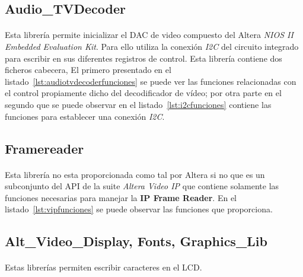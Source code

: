 \documentclass[a4paper,12pt,titlepage,final]{book}
\begin{document}
\subsection{Audio\_TVDecoder}
\paragraph{}
Esta librería permite inicializar el DAC de video compuesto del Altera \textit{NIOS II Embedded Evaluation Kit}. Para ello utiliza la conexión \textit{I2C} del circuito integrado para escribir en sus diferentes registros de control. Esta librería contiene dos ficheros cabecera, El primero presentado en el listado~\ref{lst:audiotvdecoderfunciones} se puede ver las funciones relacionadas con el control propiamente dicho del decodificador de vídeo; por otra parte en el segundo que se puede observar en el listado~\ref{lst:i2cfunciones} contiene las funciones para establecer una conexión \textit{I2C}.







\subsection{Framereader}
\paragraph{}
Esta librería no esta proporcionada como tal por Altera si no que es un subconjunto del API de la suite \textit{Altera Video IP} que contiene solamente las funciones necesarias para manejar la \textbf{IP Frame Reader}. En el listado~\ref{lst:vipfunciones} se puede observar las funciones que proporciona.

\clearpage


\subsection{Alt\_Video\_Display, Fonts, Graphics\_Lib}
\paragraph{}
Estas librerías permiten escribir caracteres en el LCD. 
\end{document}
